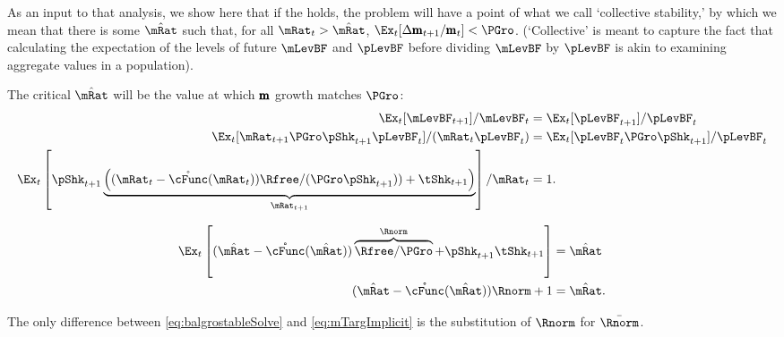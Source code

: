 \documentclass[BufferStockTheory]{subfiles}
\begin{document}
 As an input to that analysis, we show here that if the {\GIC} holds, the problem will have a point of what we call `collective stability,' by which we mean that there is some $\hat{\mRat}$ such that, for all $\mRat_{t}>\hat{\mRat}$, $\Ex_{t}[\Delta \mRatBF_{t+1}/\mRatBF_{t}] < \PGro$.  (`Collective' is meant to capture the fact that calculating the expectation of the levels of future $\mLevBF$ and $\pLevBF$ before dividing $\mLevBF$ by $\pLevBF$ is akin to examining aggregate values in a population).

 \hypertarget{balgrostable}{}

 The critical $\hat{\mRat}$ will be the value at which $\pmb{\mathrm{m}}$ growth matches $\PGro$:
  \begin{align}
  \Ex_{t}[\mLevBF_{t+1}]/\mLevBF_{t} & =\Ex_{t}[\pLevBF_{t+1}]/\pLevBF_{t} \notag
    \\  \Ex_{t}[\mRat_{t+1}\PGro\pShk_{t+1}\pLevBF_{t}]/(\mRat_{t}\pLevBF_{t}) & =\Ex_{t}[\pLevBF_{t}\PGro\pShk_{t+1}]/\pLevBF_{t} \notag
\\ \Ex_{t}\left[\pShk_{t+1}\underbrace{\left((\mRat_{t}-\mathring{\cFunc}(\mRat_{t}))\Rfree/(\PGro\pShk_{t+1}))+\tShk_{t+1}\right)}_{\mRat_{t+1}}\right]/\mRat_{t} & = 1 \label{eq:balgrostable}.  
  \end{align}

\hypertarget{balgrostableSolve}{}


\begin{align}
  \Ex_{t}\left[(\mBal-\mathring{\cFunc}(\mBal))\overbrace{\Rfree/\PGro}^{\Rnorm}+\pShk_{t+1}\tShk_{t+1}\right] & = \mBal \notag
\\  (\mBal-\mathring{\cFunc}(\mBal))\Rnorm+ 1 & = \mBal \label{eq:balgrostableSolve}.  
\end{align}

The only difference between \eqref{eq:balgrostableSolve} and \eqref{eq:mTargImplicit} is the substitution of $\Rnorm$ for $\bar{\Rnorm}$.
\end{document}
